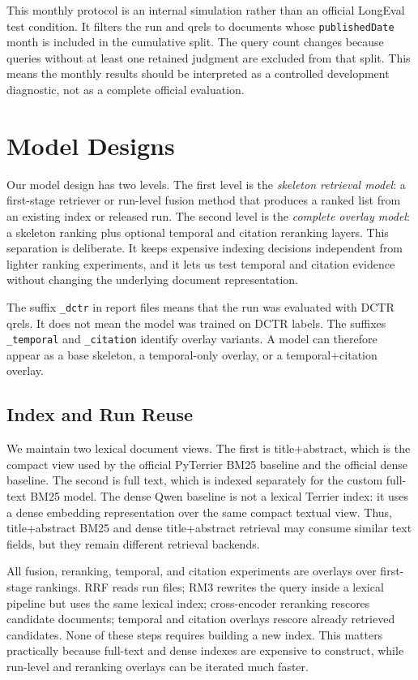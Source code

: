 \documentclass[11pt]{article}
\begin{document}
This monthly protocol is an internal simulation rather than an official LongEval test condition. It filters the run and qrels to documents whose \texttt{publishedDate} month is included in the cumulative split. The query count changes because queries without at least one retained judgment are excluded from that split. This means the monthly results should be interpreted as a controlled development diagnostic, not as a complete official evaluation.

\section{Model Designs}
\label{sec:model-designs}

Our model design has two levels. The first level is the \emph{skeleton retrieval model}: a first-stage retriever or run-level fusion method that produces a ranked list from an existing index or released run. The second level is the \emph{complete overlay model}: a skeleton ranking plus optional temporal and citation reranking layers. This separation is deliberate. It keeps expensive indexing decisions independent from lighter ranking experiments, and it lets us test temporal and citation evidence without changing the underlying document representation.

The suffix \texttt{\_dctr} in report files means that the run was evaluated with DCTR qrels. It does not mean the model was trained on DCTR labels. The suffixes \texttt{\_temporal} and \texttt{\_citation} identify overlay variants. A model can therefore appear as a base skeleton, a temporal-only overlay, or a temporal+citation overlay.

\subsection{Index and Run Reuse}

We maintain two lexical document views. The first is title+abstract, which is the compact view used by the official PyTerrier BM25 baseline and the official dense baseline. The second is full text, which is indexed separately for the custom full-text BM25 model. The dense Qwen baseline is not a lexical Terrier index: it uses a dense embedding representation over the same compact textual view. Thus, title+abstract BM25 and dense title+abstract retrieval may consume similar text fields, but they remain different retrieval backends.

All fusion, reranking, temporal, and citation experiments are overlays over first-stage rankings. RRF reads run files; RM3 rewrites the query inside a lexical pipeline but uses the same lexical index; cross-encoder reranking rescores candidate documents; temporal and citation overlays rescore already retrieved candidates. None of these steps requires building a new index. This matters practically because full-text and dense indexes are expensive to construct, while run-level and reranking overlays can be iterated much faster.
\end{document}
